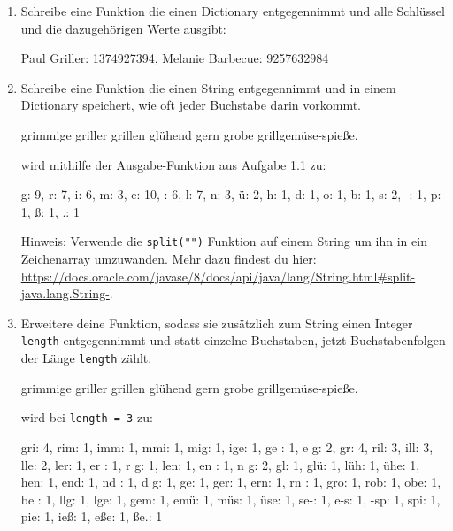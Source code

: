 \documentclass{../../sheet}
\begin{document}
\begin{enumerate}
    \item Schreibe eine Funktion die einen Dictionary entgegennimmt und alle Schlüssel und die dazugehörigen Werte ausgibt:

          \begin{ausgabe}
              Paul Griller: 1374927394, Melanie Barbecue: 9257632984
          \end{ausgabe}

    \item Schreibe eine Funktion die einen String entgegennimmt und in einem Dictionary speichert, wie oft jeder Buchstabe darin vorkommt.

          \begin{ausgabe}
              grimmige griller grillen glühend gern grobe grillgemüse-spieße.
          \end{ausgabe}
          wird mithilfe der Ausgabe-Funktion aus Aufgabe 1.1 zu:
          \begin{ausgabe}
              g: 9, r: 7, i: 6, m: 3, e: 10,  : 6, l: 7, n: 3, ü: 2, h: 1, d: 1, o: 1, b: 1, s: 2, -: 1, p: 1, ß: 1, .: 1
          \end{ausgabe}

          Hinweis: Verwende die \texttt{split("")} Funktion auf einem String um ihn in ein Zeichenarray umzuwanden. Mehr dazu findest du hier: \url{https://docs.oracle.com/javase/8/docs/api/java/lang/String.html#split-java.lang.String-}.

    \item Erweitere deine Funktion, sodass sie zusätzlich zum String einen Integer \texttt{length} entgegennimmt und statt einzelne Buchstaben, jetzt Buchstabenfolgen der Länge \texttt{length} zählt.

          \begin{ausgabe}
              grimmige griller grillen glühend gern grobe grillgemüse-spieße.
          \end{ausgabe}
          wird bei \texttt{length = 3} zu:
          \begin{ausgabe}
              gri: 4, rim: 1, imm: 1, mmi: 1, mig: 1, ige: 1, ge : 1, e g: 2,  gr: 4, ril: 3, ill: 3, lle: 2, ler: 1, er : 1, r g: 1, len: 1, en : 1, n g: 2,  gl: 1, glü: 1, lüh: 1, ühe: 1, hen: 1, end: 1, nd : 1, d g: 1,  ge: 1, ger: 1, ern: 1, rn : 1, gro: 1, rob: 1, obe: 1, be : 1, llg: 1, lge: 1, gem: 1, emü: 1, müs: 1, üse: 1, se-: 1, e-s: 1, -sp: 1, spi: 1, pie: 1, ieß: 1, eße: 1, ße.: 1
          \end{ausgabe}

\end{enumerate}
\end{document}
